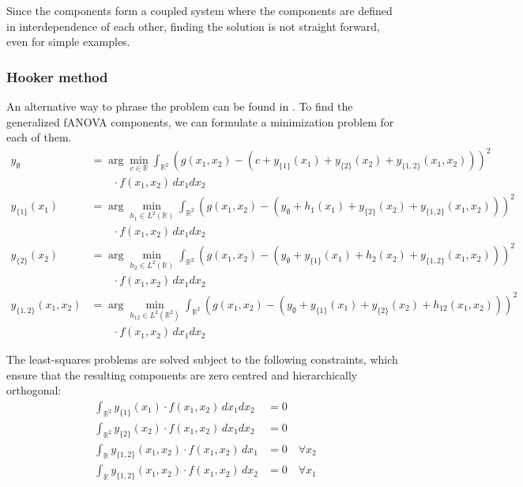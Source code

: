 Since the components form a coupled system where the components are defined in interdependence of each other, finding the solution is not straight forward, even for simple examples.

\subsubsection*{Hooker method}
An alternative way to phrase the problem can be found in \cite{hooker2007}.
To find the generalized fANOVA components, we can formulate a minimization problem for each of them. 
\begin{align}
y_{\emptyset} &= \arg\min_{c \in \mathbb{R}} \int_{\mathbb{R}^2} 
\left( g(x_1, x_2) 
- \left( c + y_{\{1\}}(x_1) + y_{\{2\}}(x_2) + y_{\{1,2\}}(x_1, x_2) \right) \right)^2 \nonumber \\
&\qquad\cdot f(x_1, x_2)\, dx_1 dx_2 \label{eq:y0_hooker} \\
y_{\{1\}}(x_1) &= \arg\min_{h_1 \in L^2(\mathbb{R})} \int_{\mathbb{R}^2} 
\left( g(x_1, x_2) 
- \left( y_{\emptyset} + h_1(x_1) + y_{\{2\}}(x_2) + y_{\{1,2\}}(x_1, x_2) \right) \right)^2 \nonumber \\
&\qquad\cdot f(x_1, x_2)\, dx_1 dx_2 \label{eq:y1_hooker} \\
y_{\{2\}}(x_2) &= \arg\min_{h_2 \in L^2(\mathbb{R})} \int_{\mathbb{R}^2} 
\left( g(x_1, x_2) 
- \left( y_{\emptyset} + y_{\{1\}}(x_1) + h_2(x_2) + y_{\{1,2\}}(x_1, x_2) \right) \right)^2 \nonumber \\
&\qquad\cdot f(x_1, x_2)\, dx_1 dx_2 \label{eq:y2_hooker} \\
y_{\{1,2\}}(x_1, x_2) &= \arg\min_{h_{12} \in L^2(\mathbb{R}^2)} \int_{\mathbb{R}^2} 
\left( g(x_1, x_2) 
- \left( y_{\emptyset} + y_{\{1\}}(x_1) + y_{\{2\}}(x_2) + h_{12}(x_1, x_2) \right) \right)^2 \nonumber \\
&\qquad\cdot f(x_1, x_2)\, dx_1 dx_2 \label{eq:y12_hooker}
\end{align}


The least-squares problems are solved subject to the following constraints, which ensure that the resulting components are zero centred and hierarchically orthogonal:
\begin{align*}
\int_{\mathbb{R}^2} y_{\{1\}}(x_1) \cdot f(x_1, x_2)\, dx_1 dx_2 &= 0 \\[1ex]
\int_{\mathbb{R}^2} y_{\{2\}}(x_2) \cdot f(x_1, x_2)\, dx_1 dx_2 &= 0 \\[1.4ex]
\int_{\mathbb{R}} y_{\{1,2\}}(x_1, x_2) \cdot f(x_1, x_2)\, dx_1 &= 0 \quad \forall x_2 \\[1ex]
\int_{\mathbb{R}} y_{\{1,2\}}(x_1, x_2) \cdot f(x_1, x_2)\, dx_2 &= 0 \quad \forall x_1
\end{align*}


